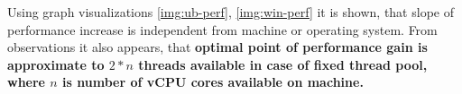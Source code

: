 Using graph visualizations \ref{img:ub-perf}, \ref{img:win-perf} it is shown, that slope of performance increase is independent from machine or operating system. From observations it also appears, that \textbf{optimal point of performance gain is approximate to \( 2 * n\) threads available in case of fixed thread pool, where \(n\) is number of vCPU cores available on machine.}